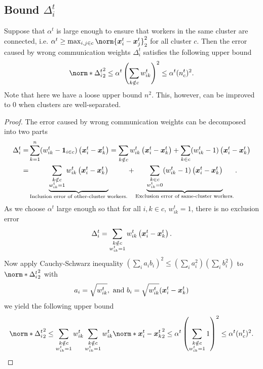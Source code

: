 \documentclass{article}
\begin{document}
\subsection{Bound $\Delta_i^t$}
\begin{lemma}
  Suppose that $\alpha^t$ is large enough to ensure that workers in the same cluster are connected, i.e.  $\alpha^t \ge \max_{i,j\in c} \norm{\xx_i^t - \xx_j^t}_2^2$ for all cluster $c$.
  Then the error caused by wrong communication weights $\Delta_i^t$ satisfies the following upper bound
  \begin{equation}\label{eq:delta:1}
    \norm*{\Delta_i^t}_2^2    \le \alpha^t \left(\sum_{k\notin c } w_{ik}^t \right)^2 
    \le \alpha^t (n_c^t)^2.
  \end{equation}
  Note that here we have a loose upper bound $n^2$. This, however, can be improved to 0 when clusters are well-separated.
\end{lemma}
\begin{proof}
  The error caused by wrong communication weights can be decomposed into two parts
  \begin{align*}
    \Delta_i^t = & \sum_{k=1}^n (w_{ik}^t - \bm{1}_{i\in c}) \left(\bm{x}_i^t - \bm{x}_k^t\right) 
    = \sum_{k\notin c} w_{ik}^t \left(\bm{x}_i^t - \bm{x}_k^t\right)
    + \sum_{k\in c} (w_{ik}^t - 1) \left(\bm{x}_i^t - \bm{x}_k^t\right) \\
    =& 
    \underbrace{\sum_{\substack{k\notin c \\ w_{ik}^t=1}} w_{ik}^t \left(\bm{x}_i^t - \bm{x}_k^t\right)}_\text{Inclusion error of other-cluster workers.}
    + \underbrace{\sum_{\substack{k\in c \\ w_{ik}^t=0}} (w_{ik}^t - 1) \left(\bm{x}_i^t - \bm{x}_k^t\right)}_\text{Exclusion error of same-cluster workers.}.
  \end{align*}
  As we choose $\alpha^t$ large enough so that for all $i,k\in c$, $w_{ik}^t=1$, there is no exclusion error
  \begin{equation}\label{eq:delta:2}
    \Delta_i^t = \sum_{\substack{k\notin c \\ w_{ik}^t=1}} w_{ik}^t \left(\bm{x}_i^t - \bm{x}_k^t\right).
  \end{equation}
  Now apply Cauchy-Schwarz inequality $(\sum_i a_i b_i)^2 \le (\sum_i a_i^2)(\sum_i b_i^2)$ to $\norm*{\Delta_i^t}_2^2$ with 
  \begin{align*}
    a_i=\sqrt{w_{ik}^t}, \text{ and } b_i=\sqrt{w_{ik}^t} (\bm{x}_i^t - \bm{x}_k^t)
  \end{align*}
  we yield the following upper bound
  \begin{equation*}
    \norm*{\Delta_i^t}_2^2\le
   \sum_{\substack{k\notin c \\ w_{ik}^t=1}} w_{ik}^t \sum_{\substack{k\notin c \\ w_{ik}^t=1}} w_{ik}^t \norm*{ \xx_i^t - \xx_k^t}_2^2
    \le \alpha^t \left(\sum_{\substack{k\notin c \\ w_{ik}^t=1}} 1\right)^2 
    \le \alpha^t(n_c^t)^2.
  \end{equation*}

\end{proof}
\end{document}
